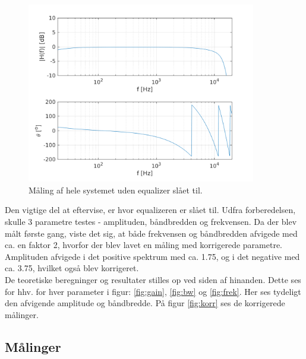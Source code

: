 \begin{figure}[h!]
	\centering
	\includegraphics[width=10cm]{matlabdemo/test/test_eq_off.png}  
	\caption{Måling af hele systemet uden equalizer slået til.}
	\label{fig:eq_off1}
\end{figure}

Den vigtige del at eftervise, er hvor equalizeren er slået til. 
Udfra forberedelsen, skulle 3 parametre testes - amplituden, båndbredden og frekvensen. 
Da der blev målt første gang, viste det sig, at både frekvensen og båndbredden afvigede med ca. en faktor 2, hvorfor der blev lavet en måling med korrigerede parametre. Amplituden afvigede i det positive spektrum med ca. 1.75, og i det negative med ca. 3.75, hvilket også blev korrigeret. \\

De teoretiske beregninger og resultater stilles op ved siden af hinanden.
Dette ses for hhv. for hver parameter i figur: \ref{fig:gain}, \ref{fig:bw} og \ref{fig:frek}. 
Her ses tydeligt den afvigende amplitude og båndbredde. På figur \ref{fig:korr} ses de korrigerede målinger. 

\subsection{Målinger}

